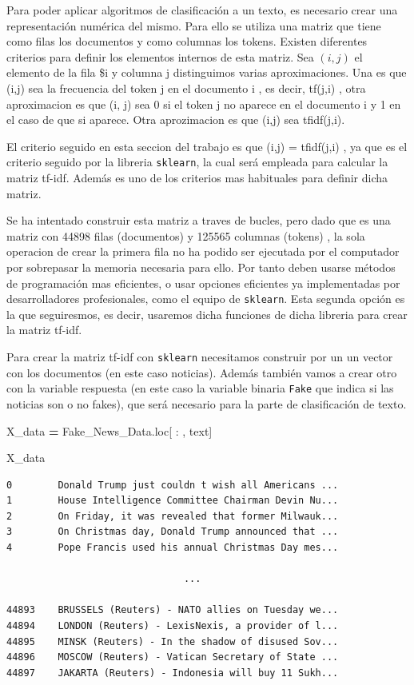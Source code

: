 \documentclass[
  11pt,
  a4paper,
]{article}
\newenvironment{Shaded}{\begin{snugshade}}{\end{snugshade}}
\newcommand{\NormalTok}[1]{#1}
\newcommand{\OperatorTok}[1]{\textcolor[rgb]{0.81,0.36,0.00}{\textbf{#1}}}
\newcommand{\StringTok}[1]{\textcolor[rgb]{0.31,0.60,0.02}{#1}}
\begin{document}
Para poder aplicar algoritmos de clasificación a un texto, es necesario
crear una representación numérica del mismo. Para ello se utiliza una
matriz que tiene como filas los documentos y como columnas los tokens.
Existen diferentes criterios para definir los elementos internos de esta
matriz. Sea \((i,j)\) el elemento de la fila \$i y columna j
distinguimos varias aproximaciones. Una es que (i,j) sea la frecuencia
del token j en el documento i , es decir, tf(j,i) , otra aproximacion es
que (i, j) sea 0 si el token j no aparece en el documento i y 1 en el
caso de que si aparece. Otra aprozimacion es que (i,j) sea tfidf(j,i).

El criterio seguido en esta seccion del trabajo es que (i,j) =
tfidf(j,i) , ya que es el criterio seguido por la libreria
\texttt{sklearn}, la cual será empleada para calcular la matriz tf-idf.
Además es uno de los criterios mas habituales para definir dicha matriz.

Se ha intentado construir esta matriz a traves de bucles, pero dado que
es una matriz con 44898 filas (documentos) y 125565 columnas (tokens) ,
la sola operacion de crear la primera fila no ha podido ser ejecutada
por el computador por sobrepasar la memoria necesaria para ello. Por
tanto deben usarse métodos de programación mas eficientes, o usar
opciones eficientes ya implementadas por desarrolladores profesionales,
como el equipo de \texttt{sklearn}. Esta segunda opción es la que
seguiresmos, es decir, usaremos dicha funciones de dicha libreria para
crear la matriz tf-idf.

Para crear la matriz tf-idf con \texttt{sklearn} necesitamos construir
por un un vector con los documentos (en este caso noticias). Además
también vamos a crear otro con la variable respuesta (en este caso la
variable binaria \texttt{Fake} que indica si las noticias son o no
fakes), que será necesario para la parte de clasificación de texto.

\begin{Shaded}
\begin{Highlighting}[]
\NormalTok{X\_data }\OperatorTok{=}\NormalTok{ Fake\_News\_Data.loc[ : , }\StringTok{\textquotesingle{}text\textquotesingle{}}\NormalTok{]}

\NormalTok{X\_data}
\end{Highlighting}
\end{Shaded}

\begin{verbatim}
0        Donald Trump just couldn t wish all Americans ...
1        House Intelligence Committee Chairman Devin Nu...
2        On Friday, it was revealed that former Milwauk...
3        On Christmas day, Donald Trump announced that ...
4        Pope Francis used his annual Christmas Day mes...
                               
                               ... 
                               
44893    BRUSSELS (Reuters) - NATO allies on Tuesday we...
44894    LONDON (Reuters) - LexisNexis, a provider of l...
44895    MINSK (Reuters) - In the shadow of disused Sov...
44896    MOSCOW (Reuters) - Vatican Secretary of State ...
44897    JAKARTA (Reuters) - Indonesia will buy 11 Sukh...
\end{verbatim}
\end{document}
